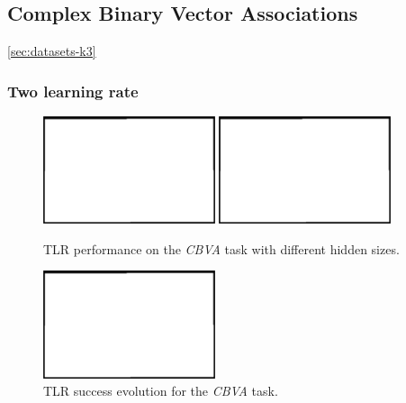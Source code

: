 
\subsection{Complex Binary Vector Associations} 

\ref{sec:datasets-k3} 


\subsubsection{Two learning rate} 
\label{sec:tlr-k3}

\begin{figure}[H]
  \centering
  \includegraphics[width=0.45\textwidth]{img/placeholder.png}  %
  \includegraphics[width=0.45\textwidth]{img/placeholder.png}  %
  \caption{TLR performance on the \emph{CBVA} task with different hidden sizes.}
  \label{fig:results-tlr-k3-success}
\end{figure}

\begin{figure}[H]
  \centering
  \includegraphics[width=0.45\textwidth]{img/placeholder.png}  %
  \caption{TLR success evolution for the \emph{CBVA} task.}
  \label{fig:results-tlr-k3-epoch} 
\end{figure}


